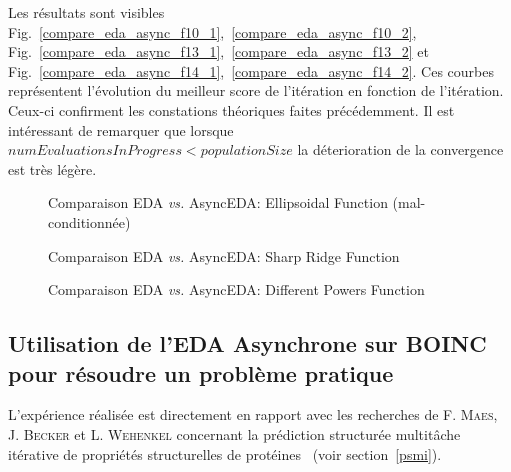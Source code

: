 \documentclass[a4paper, 11pt]{report}
\begin{document}
Les résultats sont visibles Fig.~\ref{compare_eda_async_f10_1},~\ref{compare_eda_async_f10_2}, Fig.~\ref{compare_eda_async_f13_1},~\ref{compare_eda_async_f13_2} et Fig.~\ref{compare_eda_async_f14_1},~\ref{compare_eda_async_f14_2}. Ces courbes représentent l'évolution du meilleur score de l'itération en fonction de l'itération. Ceux-ci confirment les constations théoriques faites précédemment. Il est intéressant de remarquer que lorsque $numEvaluationsInProgress < populationSize$ la déterioration de la convergence est très légère.

\begin{figure}[!h]
\centering
{}
\label{compare_eda_async_f10}
\caption{Comparaison EDA \textit{vs.} AsyncEDA: Ellipsoidal Function (mal-conditionnée)}
\end{figure}

\begin{figure}[!h]
\centering
{}
\label{compare_eda_async_f13}
\caption{Comparaison EDA \textit{vs.} AsyncEDA: Sharp Ridge Function}
\end{figure}

\begin{figure}[!h]
\centering
{}
\label{compare_eda_async_f14}
\caption{Comparaison EDA \textit{vs.} AsyncEDA: Different Powers Function}
\end{figure}

\subsection{Utilisation de l'EDA Asynchrone sur \textsc{BOINC} pour résoudre un problème pratique}
L'expérience réalisée est directement en rapport avec les recherches de F. \textsc{Maes}, J. \textsc{Becker} et L. \textsc{Wehenkel} concernant la prédiction structurée multitâche itérative de propriétés structurelles de protéines~\cite{CAP} (voir section~\ref{psmi}).
\end{document}
